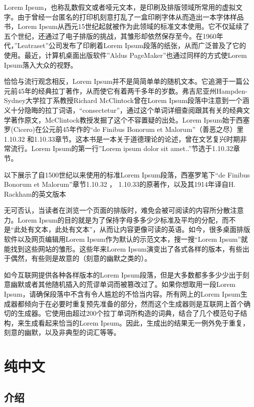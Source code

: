 \documentclass[10pt,openany]{book}
\begin{document}
Lorem Ipsum，也称乱数假文或者哑元文本，是印刷及排版领域所常用的虚拟文字。由于曾经一台匿名的打印机刻意打乱了一盒印刷字体从而造出一本字体样品书，Lorem Ipsum从西元15世纪起就被作为此领域的标准文本使用。它不仅延续了五个世纪，还通过了电子排版的挑战，其雏形却依然保存至今。在1960年代，”Leatraset”公司发布了印刷着Lorem Ipsum段落的纸张，从而广泛普及了它的使用。最近，计算机桌面出版软件”Aldus PageMaker”也通过同样的方式使Lorem Ipsum落入大众的视野。

恰恰与流行观念相反，Lorem Ipsum并不是简简单单的随机文本。它追溯于一篇公元前45年的经典拉丁著作，从而使它有着两千多年的岁数。弗吉尼亚州Hampden-Sydney大学拉丁系教授Richard McClintock曾在Lorem Ipsum段落中注意到一个涵义十分隐晦的拉丁词语，“consectetur”，通过这个单词详细查阅跟其有关的经典文学著作原文，McClintock教授发掘了这个不容置疑的出处。Lorem Ipsum始于西塞罗(Cicero)在公元前45年作的“de Finibus Bonorum et Malorum”（善恶之尽）里1.10.32 和1.10.33章节。这本书是一本关于道德理论的论述，曾在文艺复兴时期非常流行。Lorem Ipsum的第一行”Lorem ipsum dolor sit amet..”节选于1.10.32章节。

以下展示了自1500世纪以来使用的标准Lorem Ipsum段落，西塞罗笔下“de Finibus Bonorum et Malorum”章节1.10.32 ， 1.10.33的原著作，以及其1914年译自H. Rackham的英文版本

无可否认，当读者在浏览一个页面的排版时，难免会被可阅读的内容所分散注意力。Lorem Ipsum的目的就是为了保持字母多多少少标准及平均的分配，而不是“此处有文本，此处有文本”，从而让内容更像可读的英语。如今，很多桌面排版软件以及网页编辑用Lorem Ipsum作为默认的示范文本，搜一搜“Lorem Ipsum”就能找到这些网站的雏形。这些年来Lorem Ipsum演变出了各式各样的版本，有些出于偶然，有些则是故意的（刻意的幽默之类的）。

如今互联网提供各种各样版本的Lorem Ipsum段落，但是大多数都多多少少出于刻意幽默或者其他随机插入的荒谬单词而被篡改过了。如果你想取用一段Lorem Ipsum，请确保段落中不含有令人尴尬的不恰当内容。所有网上的Lorem Ipsum生成器都倾向于在必要时重复预先准备的部分，然而这个生成器则是互联网上首个确切的生成器。它使用由超过200个拉丁单词所构造的词典，结合了几个模范句子结构，来生成看起来恰当的Lorem Ipsum。因此，生成出的结果无一例外免于重复，刻意的幽默，以及非典型的词汇等等。

\vfill

\theendnotes

\chapter{纯中文}

\section*{介绍}
\end{document}
